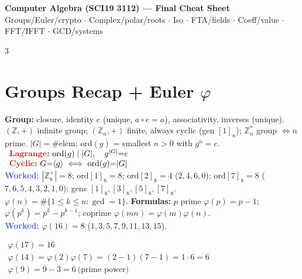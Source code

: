 \documentclass[9pt]{extarticle}
\newcommand{\hl}[1]{\textbf{\textcolor{BrickRed}{#1}}}
\newcommand{\ex}[1]{\textbf{\textcolor{RoyalBlue}{#1}}}
\newcommand{\sepline}{\vspace{1pt}{\color{RoyalBlue}\hrule}\vspace{3pt}}
\begin{document}
\footnotesize

\AddToShipoutPicture*{%
\AtTextUpperLeft{%
\raisebox{6pt}{\makebox[\textwidth][r]{\normalfont\scriptsize\textcolor{black!60}{Updated: 24 Sep 2026 04:55}}}%
}%
}
\begin{center}
\colorbox{RoyalBlue!15}{\parbox{0.97\linewidth}{\centering
{\bfseries\large\color{RoyalBlue} Computer Algebra (SCI19 3112) --- Final Cheat Sheet}\\[1.5pt]
{\scriptsize\color{RoyalBlue!70!black} Groups/Euler/crypto $\cdot$ Complex/polar/roots $\cdot$ Iso $\cdot$ FTA/fields $\cdot$ Coeff/value $\cdot$ FFT/IFFT $\cdot$ GCD/systems}}}
\end{center}
\sepline

\begin{multicols}{3}

\section{Groups Recap + Euler $\varphi$}
\begin{sloppypar}\raggedright
\textbf{Group:} closure, identity $e$ (unique, $a{\circ}e{=}a$), associativity, inverses (unique). $(\mathbb Z,{+})$ infinite group; $(\mathbb Z_n,{+})$ finite, always cyclic (gen $[1]_n$); $\mathbb Z_n^*$ group $\iff n$ prime. $|G|{=}\#$elem; $\mathrm{ord}(g)$ = smallest $n{>}0$ with $g^n{=}e$.\\
$\begin{array}{l}
\hl{Lagrange:}\ \mathrm{ord}(g)\mid|G|,\quad g^{|G|}{=}e\\
\hl{Cyclic:}\ G{=}\langle g\rangle\iff\mathrm{ord}(g){=}|G|
\end{array}$\\
\ex{Worked:} $|\mathbb Z_8^+|{=}8$; $\mathrm{ord}[1]_8{=}8$; $\mathrm{ord}[2]_8{=}4$ ($2,4,6,0$); $\mathrm{ord}[7]_8{=}8$ ($7,6,5,4,3,2,1,0$); gens $[1]_8,[3]_8,[5]_8,[7]_8$.\\
$\varphi(n){=}\#\{1{\le}k{\le}n:\gcd{=}1\}$. \hl{Formulas:} $p$ prime $\varphi(p){=}p{-}1$; $\varphi(p^k){=}p^k{-}p^{k-1}$; coprime $\varphi(mn){=}\varphi(m)\varphi(n)$.\\
\ex{Worked:} $\varphi(16){=}8$ ($1,3,5,7,9,11,13,15$).
\end{sloppypar}
$\begin{array}{l}
\varphi(17)=16\\
\varphi(14)=\varphi(2)\varphi(7)=(2-1)(7-1)=1\cdot6=6\\
\varphi(9)=9-3=6\ \text{(prime power)}
\end{array}$

\end{multicols}
\end{document}
